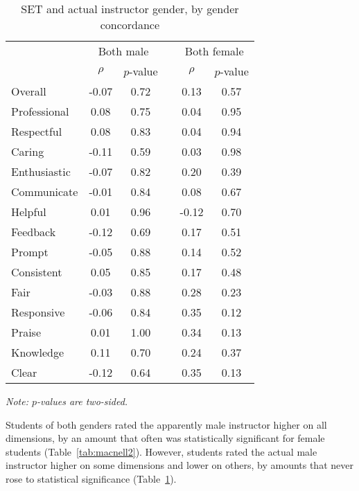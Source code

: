 \documentclass[12pt]{article}
\begin{document}
\begin{table}[htbp]
  \centering
  \footnotesize 
  \caption{SET and actual instructor gender, by gender concordance}
    \begin{tabular}{lccccc}
    \toprule 
          & \multicolumn{2}{c}{Both male}  &  & \multicolumn{2}{c}{Both female} \\
                          & $\rho$  &  $p$-value &  & $\rho$  &  $p$-value    \\
                          
   \midrule
    Overall &                -0.07       & 0.72 & &  0.13    & 0.57   \\
    Professional &            0.08       & 0.75 & &  0.04    & 0.95   \\
    Respectful	      &  0.08       & 0.83 & &  0.04    & 0.94   \\
    Caring &                 -0.11       & 0.59 & &  0.03    & 0.98  \\
    Enthusiastic   &         -0.07       & 0.82 & &  0.20    & 0.39   \\
    Communicate        &     -0.01       & 0.84 & &  0.08    & 0.67  \\
    Helpful   &               0.01       & 0.96 & & -0.12    & 0.70   \\
    Feedback   &             -0.12       & 0.69 & &  0.17    & 0.51   \\
    Prompt    &              -0.05       & 0.88 & &  0.14    & 0.52   \\
    Consistent   &            0.05       & 0.85 & &  0.17    & 0.48   \\
    Fair   &                 -0.03       & 0.88 & &  0.28    & 0.23  \\
    Responsive   &           -0.06       & 0.84 & &  0.35    & 0.12  \\
    Praise   &                0.01       & 1.00 & &  0.34    & 0.13  \\
    Knowledge   &             0.11       & 0.70 & &  0.24    & 0.37  \\
    Clear   &                -0.12       & 0.64 & &  0.35    & 0.13  \\
    \bottomrule
    \end{tabular}%
 \label{tab:macnell3}%

  \textit{Note: $p$-values are two-sided.}  
\end{table}%
\normalsize

Students of both genders rated the apparently male instructor higher on all
dimensions, by an amount that often was statistically significant for female students 
(Table~\ref{tab:macnell2}).
However, students rated the actual male instructor higher on some dimensions
and lower on others, by amounts that never rose to statistical significance
(Table~\ref{tab:macnell3}). 
\end{document}
